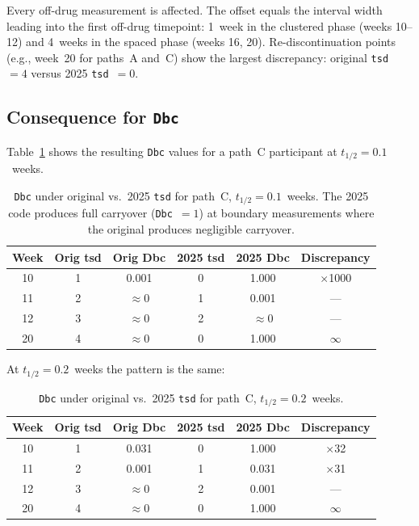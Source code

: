 \documentclass[11pt]{article}
\begin{document}
\noindent Every off-drug measurement is affected. The offset equals
the interval width leading into the first off-drug timepoint: 1~week
in the clustered phase (weeks 10--12) and 4~weeks in the spaced phase
(weeks 16, 20). Re-discontinuation points (e.g., week~20 for paths~A
and~C) show the largest discrepancy: original \texttt{tsd}~$= 4$
versus 2025 \texttt{tsd}~$= 0$.

\subsection{Consequence for \texttt{Dbc}}

Table~\ref{tab:dbc_compare} shows the resulting \texttt{Dbc} values
for a path~C participant at $t_{1/2} = 0.1$~weeks.

\begin{table}[h]
\centering
\caption{\texttt{Dbc} under original vs.\ 2025 \texttt{tsd} for
  path~C, $t_{1/2} = 0.1$~weeks. The 2025 code produces full
  carryover (\texttt{Dbc}~$= 1$) at boundary measurements where the
  original produces negligible carryover.}
\label{tab:dbc_compare}
\begin{tabular}{@{}cccccc@{}}
\toprule
Week & Orig tsd & Orig Dbc & 2025 tsd & 2025 Dbc & Discrepancy \\
\midrule
10 & 1 & 0.001  & 0 & 1.000 & $\times$1000 \\
11 & 2 & $\approx$0 & 1 & 0.001 & --- \\
12 & 3 & $\approx$0 & 2 & $\approx$0 & --- \\
20 & 4 & $\approx$0 & 0 & 1.000 & $\infty$ \\
\bottomrule
\end{tabular}
\end{table}

At $t_{1/2} = 0.2$~weeks the pattern is the same:

\begin{table}[h]
\centering
\caption{\texttt{Dbc} under original vs.\ 2025 \texttt{tsd} for
  path~C, $t_{1/2} = 0.2$~weeks.}
\label{tab:dbc_compare_02}
\begin{tabular}{@{}cccccc@{}}
\toprule
Week & Orig tsd & Orig Dbc & 2025 tsd & 2025 Dbc & Discrepancy \\
\midrule
10 & 1 & 0.031  & 0 & 1.000 & $\times$32 \\
11 & 2 & 0.001  & 1 & 0.031 & $\times$31 \\
12 & 3 & $\approx$0 & 2 & 0.001 & --- \\
20 & 4 & $\approx$0 & 0 & 1.000 & $\infty$ \\
\bottomrule
\end{tabular}
\end{table}
\end{document}
